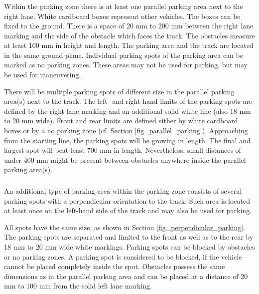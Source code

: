 \subsubsection{}

Within the parking zone there is at least one parallel parking area next to the
right lane. White cardboard boxes represent other vehicles. The boxes can be
fixed to the ground. There is a space of 20 mm to 200 mm between the right lane
marking and the side of the obstacle which faces the track. The obstacles
measure at least 100 mm in height and length. The parking area and the track
are located in the same ground plane. Individual parking spots of the parking
area can be marked as no parking zones. These areas may not be used for
parking, but may be used for maneuvering.

There will be multiple parking spots of different size in the parallel parking
area(s) next to the track. The left- and right-hand limits of the parking spots
are defined by the right lane marking and an additional solid white line (also
18 mm to 20 mm wide). Front and rear limits are defined either by white
cardboard boxes or by a no parking zone (cf. Section
\ref{fig_parallel_parking}). Approaching from the starting line, the parking
spots will be growing in length. The final and largest spot will beat least 700
mm in length. Nevertheless, small distances of under 400 mm might be present
between obstacles anywhere inside the parallel parking area(s).

\subsubsection{}

An additional type of parking area within the parking zone consists of several
parking spots with a perpendicular orientation to the track. Such area is
located at least once on the left-hand side of the track and may also be used
for parking.

All spots have the same size, as shown in Section
\ref{fig_perpendicular_parking}. The parking spots are separated and limited to
the front as well as to the rear by 18 mm to 20 mm wide white markings. Parking
spots can be blocked by obstacles or no parking zones. A parking spot is
considered to be blocked, if the vehicle cannot be placed completely inside the
spot. Obstacles possess the same dimensions as in the parallel parking area and
can be placed at a distance of 20 mm to 100 mm from the solid left lane
marking.

